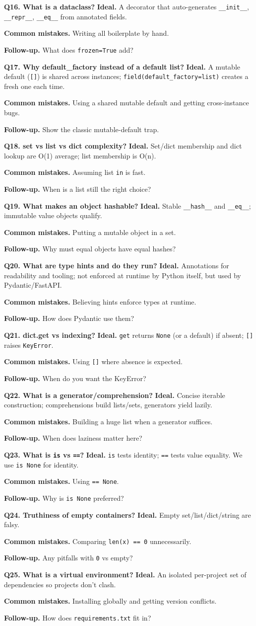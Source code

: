 \documentclass[11pt,a4paper]{report}
\newcommand{\qa}[3]{%
  \textbf{Ideal.} #1\par
  \textbf{Common mistakes.} #2\par
  \textbf{Follow-up.} #3\par
  \vspace{4pt}
}
\begin{document}
\textbf{Q16. What is a dataclass?}
\qa{A decorator that auto-generates \texttt{\_\_init\_\_}, \texttt{\_\_repr\_\_},
\texttt{\_\_eq\_\_} from annotated fields.}
{Writing all boilerplate by hand.}
{What does \texttt{frozen=True} add?}

\textbf{Q17. Why default\_factory instead of a default list?}
\qa{A mutable default (\texttt{[]}) is shared across instances; \texttt{field(default\_factory=list)}
creates a fresh one each time.}
{Using a shared mutable default and getting cross-instance bugs.}
{Show the classic mutable-default trap.}

\textbf{Q18. set vs list vs dict complexity?}
\qa{Set/dict membership and dict lookup are O(1) average; list membership is
O(n).}
{Assuming list \texttt{in} is fast.}
{When is a list still the right choice?}

\textbf{Q19. What makes an object hashable?}
\qa{Stable \texttt{\_\_hash\_\_} and \texttt{\_\_eq\_\_}; immutable value objects
qualify.}
{Putting a mutable object in a set.}
{Why must equal objects have equal hashes?}

\textbf{Q20. What are type hints and do they run?}
\qa{Annotations for readability and tooling; not enforced at runtime by Python
itself, but used by Pydantic/FastAPI.}
{Believing hints enforce types at runtime.}
{How does Pydantic use them?}

\textbf{Q21. dict.get vs indexing?}
\qa{\texttt{get} returns \texttt{None} (or a default) if absent; \texttt{[]}
raises \texttt{KeyError}.}
{Using \texttt{[]} where absence is expected.}
{When do you want the KeyError?}

\textbf{Q22. What is a generator/comprehension?}
\qa{Concise iterable construction; comprehensions build lists/sets, generators
yield lazily.}
{Building a huge list when a generator suffices.}
{When does laziness matter here?}

\textbf{Q23. What is \texttt{is} vs \texttt{==}?}
\qa{\texttt{is} tests identity; \texttt{==} tests value equality. We use
\texttt{is None} for identity.}
{Using \texttt{== None}.}
{Why is \texttt{is None} preferred?}

\textbf{Q24. Truthiness of empty containers?}
\qa{Empty set/list/dict/string are falsy.}
{Comparing \texttt{len(x) == 0} unnecessarily.}
{Any pitfalls with \texttt{0} vs empty?}

\textbf{Q25. What is a virtual environment?}
\qa{An isolated per-project set of dependencies so projects don't clash.}
{Installing globally and getting version conflicts.}
{How does \texttt{requirements.txt} fit in?}
\end{document}
